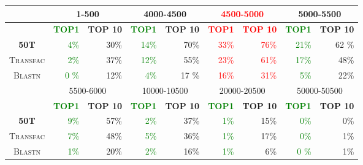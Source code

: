\documentclass[a4paper,10pt]{article}
\newcommand{\negr}
      {\textbf}
\newcommand{\ver}
      {\textsc}
\begin{document}
\pagestyle{empty}

\begin{center}
\begin{tabular}{|>{\scshape}c|r|r|r|r|r|r|r|r|}
\hline
& \multicolumn{2}{|c|}{1-500} & \multicolumn{2}{|c|}{4000-4500} & \multicolumn{2}{|c|}{\textcolor{red}{4500-5000}} & \multicolumn{2}{|c|}{5000-5500}\\
\hline
\rowcolor[gray]{0.9}
& \textcolor{green}{\negr{TOP1}} & \negr{TOP 10} & \textcolor{green}{\negr{TOP1}} & \negr{TOP 10} & \textcolor{red}{\negr{TOP1}} & \textcolor{red}{\negr{TOP 10}}  & \textcolor{green}{\negr{TOP1}} & \negr{TOP 10}\\
\hline
\negr{50T} & \textcolor{green}{4\%} & 30\% & \textcolor{green}{14\%} & 70\% & \textcolor{red}{33\%} & \textcolor{red}{76\%} & \textcolor{green}{21\%} & 62 \%\\
\hline
\ver{Transfac} & \textcolor{green}{2\%} & 37\% & \textcolor{green}{12\%} & 55\% &\textcolor{red}{23\%} & \textcolor{red}{61\%} & \textcolor{green}{17\%} & 48\%\\
\hline
\hline
\ver{Blastn} & \textcolor{green}{0 \%} & 12\% & \textcolor{green}{4\%} & 17 \% &\textcolor{red}{16\%} & \textcolor{red}{31\%} & \textcolor{green}{5\%} & 22\%\\
\hline
\hline
& \multicolumn{2}{|c|}{5500-6000}  & \multicolumn{2}{|c|}{10000-10500} & \multicolumn{2}{|c|}{20000-20500} &  \multicolumn{2}{|c|}{50000-50500}\\
\hline
\rowcolor[gray]{0.9}
 & \textcolor{green}{\negr{TOP1}} & \negr{TOP 10} & \textcolor{green}{\negr{TOP1}} & \negr{TOP 10} & \textcolor{green}{\negr{TOP1}} & \negr{TOP 10} & \textcolor{green}{\negr{TOP1}} & \negr{TOP 10}\\
\hline
\negr{50T} & \textcolor{green}{9\%} & 57\% & \textcolor{green}{2\%} & 37\% & \textcolor{green}{1\%} & 15\% & \textcolor{green}{0\%} & 0\% \\
\hline
\ver{Transfac} & \textcolor{green}{7\%} & 48\% & \textcolor{green}{5\%} & 36\% & \textcolor{green}{1\%} & 17\% & \textcolor{green}{0\%} & 1\% \\
\hline
\ver{Blastn} & \textcolor{green}{1\%} & 20\% & \textcolor{green}{2\%} & 16\% & \textcolor{green}{1\%} & 6\% & \textcolor{green}{ 0 \%} & 1\% \\
\hline
\end{tabular}
\end{center}
\end{document}
